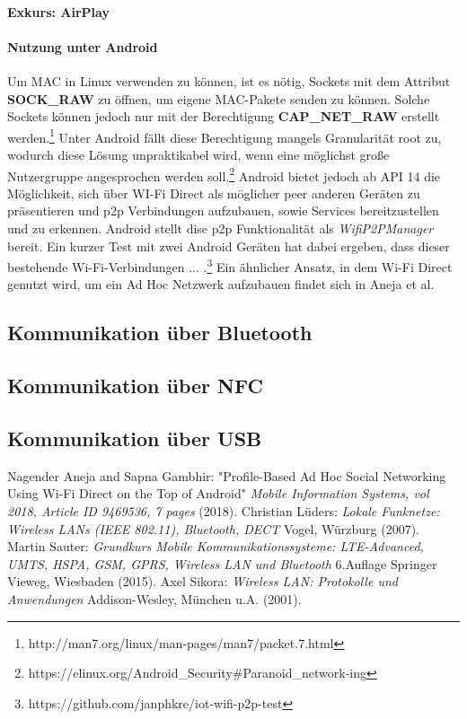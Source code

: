 \documentclass[12pt,a4paper]{article}
\begin{document}
            \paragraph{Exkurs: AirPlay}

        
            \paragraph{Nutzung unter Android}
            Um MAC in Linux verwenden zu können, ist es nötig, Sockets mit dem Attribut {\bf SOCK\_RAW} zu öffnen,
            um eigene MAC-Pakete senden zu können. Solche Sockets können jedoch nur mit der Berechtigung {\bf CAP\_NET\_RAW} erstellt werden.\footnote{http://man7.org/linux/man-pages/man7/packet.7.html}
            Unter Android fällt diese Berechtigung mangels Granularität root zu, wodurch diese Lösung unpraktikabel wird,
            wenn eine möglichst große Nutzergruppe angesprochen werden soll.\footnote{https://elinux.org/Android\_Security\#Paranoid\_network-ing}
            Android bietet jedoch ab API 14 die Möglichkeit, sich über WI-Fi Direct als möglicher peer anderen Geräten zu präsentieren und
            p2p Verbindungen aufzubauen, sowie Services bereitzustellen und zu erkennen.
            Android stellt dise p2p Funktionalität als {\it WifiP2PManager} bereit. Ein kurzer Test mit zwei Android Geräten hat dabei ergeben,
            dass dieser bestehende Wi-Fi-Verbindungen ... .\footnote{https://github.com/janphkre/iot-wifi-p2p-test}
            Ein ähnlicher Ansatz, in dem Wi-Fi Direct genutzt wird, um ein Ad Hoc Netzwerk aufzubauen findet sich in Aneja et al.

        \subsection{Kommunikation über Bluetooth}

        \subsection{Kommunikation über NFC}

        \subsection{Kommunikation über USB}
    \pagebreak
    \begin{thebibliography}{10}
        Nagender Aneja and Sapna Gambhir: "Profile-Based Ad Hoc Social Networking Using Wi-Fi Direct on the Top of Android" {\it Mobile Information Systems, vol 2018, Article ID 9469536, 7 pages} (2018).
        Christian Lüders: {\it Lokale Funknetze: Wireless LANs (IEEE 802.11), Bluetooth, DECT} Vogel, Würzburg (2007).
        Martin Sauter: {\it Grundkurs Mobile Kommunikationssysteme: LTE-Advanced, UMTS, HSPA, GSM, GPRS, Wireless LAN und Bluetooth} 6.Auflage Springer Vieweg, Wiesbaden (2015).
        Axel Sikora: {\it Wireless LAN: Protokolle und Anwendungen} Addison-Wesley, München u.A. (2001).
    \end{thebibliography}
\end{document}
